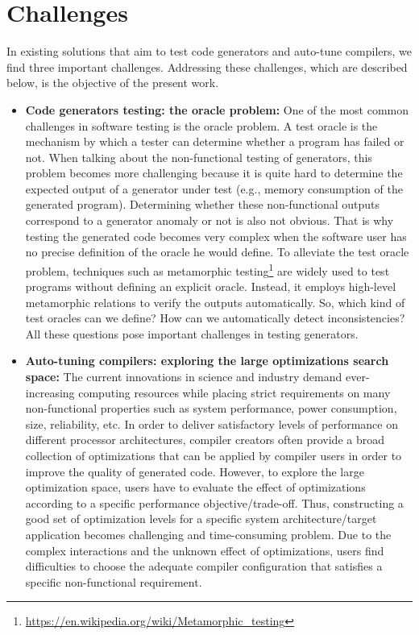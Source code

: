\section{Challenges}
In existing solutions that aim to test code generators and auto-tune compilers, we find three important challenges. Addressing these challenges, which are described below, is the objective of the present work.
\begin{itemize}
\item
\textbf{Code generators testing: the oracle problem:} One of the most common challenges in software testing is the oracle problem. A test oracle is the mechanism by which a tester can determine whether a program has failed or not.
When talking about the non-functional testing of generators, this problem becomes more challenging because it is quite hard to determine the expected output of a generator under test (e.g., memory consumption of the generated program). Determining whether these non-functional outputs correspond to a generator anomaly or not is also not obvious. That is why testing the generated code becomes very complex when the software user has no precise definition of the oracle he would define. 
To alleviate the test oracle problem, techniques such as metamorphic testing\footnote{\url{https://en.wikipedia.org/wiki/Metamorphic_testing}} are widely used to test programs without defining an explicit oracle. Instead, it employs high-level metamorphic relations to verify the outputs automatically.
So, which kind of test oracles can we define? How can we automatically detect inconsistencies? All these questions pose important challenges in testing generators.

\item
\textbf{Auto-tuning compilers: exploring the large optimizations search space:} The current innovations in science and industry demand ever-increasing computing resources while placing strict requirements on many non-functional properties such as system performance, power consumption, size, reliability, etc. In order to deliver satisfactory levels of performance on different processor architectures, compiler creators often provide a broad collection of optimizations that can be applied by compiler users in order to improve the quality of generated code. However, to explore the large optimization space, users have to evaluate the effect of optimizations according to a specific performance objective/trade-off. Thus, constructing a good set of optimization levels for a specific system architecture/target application becomes challenging and time-consuming problem. Due to the complex interactions and the unknown effect of optimizations, users find difficulties to choose the adequate compiler configuration that satisfies a specific non-functional requirement.


\end{itemize}

